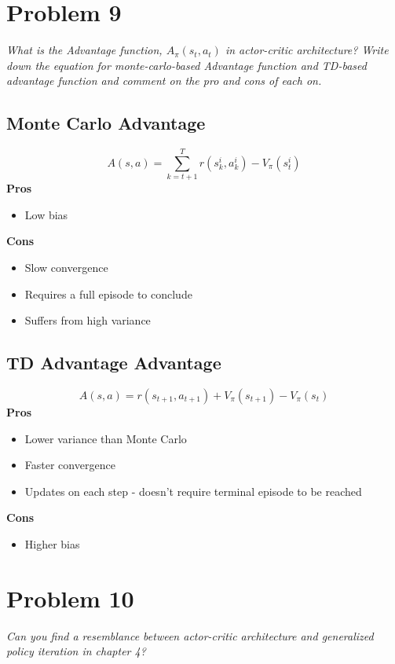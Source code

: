 \documentclass{article}
\begin{document}
\section*{Problem 9}
\textit{What is the Advantage function, $A_\pi(s_t,a_t)$ in actor-critic architecture? Write down the
equation for monte-carlo-based Advantage function and TD-based advantage function and
comment on the pro and cons of each on.}

\subsection*{Monte Carlo Advantage}
\begin{equation}
    A(s,a) = \sum^T_{k=t+1} r(s^i_k, a^i_k ) - V_\pi(s^i_t)
\end{equation}
\textbf{Pros}
\begin{itemize}
    \item Low bias
\end{itemize}

\textbf{Cons}
\begin{itemize}
    \item Slow convergence
    \item Requires a full episode to conclude
    \item Suffers from high variance
\end{itemize}

\subsection*{TD Advantage Advantage}
\begin{equation}
    A(s,a) = r(s_{t+1}, a_{t+1}) + V_\pi(s_{t+1}) - V_\pi(s_t)
\end{equation}
\textbf{Pros}
\begin{itemize}
    \item Lower variance than Monte Carlo
    \item Faster convergence
    \item Updates on each step - doesn't require terminal episode to be reached
\end{itemize}

\textbf{Cons}
\begin{itemize}
    \item Higher bias
\end{itemize}

\section*{Problem 10}
\textit{Can you find a resemblance between actor-critic architecture and generalized policy iteration in
chapter 4?}
\end{document}
